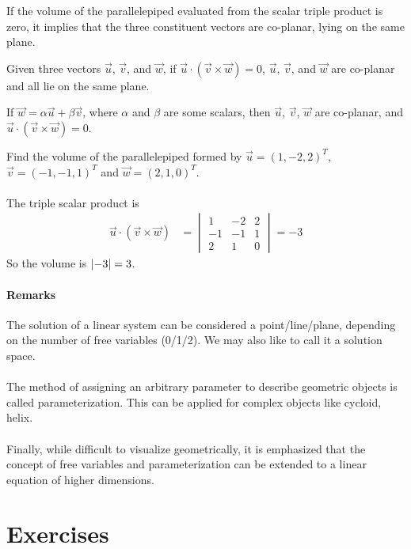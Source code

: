 If the volume of the parallelepiped evaluated from the scalar triple product is zero, it implies that the three constituent vectors are co-planar, lying on the same plane.
\begin{proper}
Given three vectors $\vec{u}$, $\vec{v}$, and $\vec{w}$, if $\vec{u} \cdot (\vec{v} \times \vec{w}) = 0$, $\vec{u}$, $\vec{v}$, and $\vec{w}$ are co-planar and all lie on the same plane.
\end{proper}
If $\vec{w} = \alpha \vec{u} + \beta \vec{v}$, where $\alpha$ and $\beta$ are some scalars, then $\vec{u}$, $\vec{v}$, $\vec{w}$ are co-planar, and $\vec{u} \cdot (\vec{v} \times \vec{w}) = 0$.

\begin{exmp}
Find the volume of the parallelepiped formed by $\vec{u} = (1,-2,2)^T$, $\vec{v}=(-1,-1,1)^T$ and $\vec{w}=(2,1,0)^T$.\\
\\
The triple scalar product is
\begin{align*}
\vec{u} \cdot (\vec{v} \times \vec{w}) &=
\begin{vmatrix}
1 & -2 & 2 \\
-1 & -1 & 1 \\
2 & 1 & 0
\end{vmatrix}
= -3
\end{align*}
So the volume is $\abs{-3} = 3$.
\end{exmp}

\paragraph{Remarks}
The solution of a linear system can be considered a point/line/plane, depending on the number of free variables (0/1/2). We may also like to call it a solution space. \\
\\
The method of assigning an arbitrary parameter to describe geometric objects is called parameterization. This can be applied for complex objects like cycloid, helix.\\
\\
Finally, while difficult to visualize geometrically, it is emphasized that the concept of free variables and parameterization can be extended to a linear equation of higher dimensions.

\section{Exercises}

